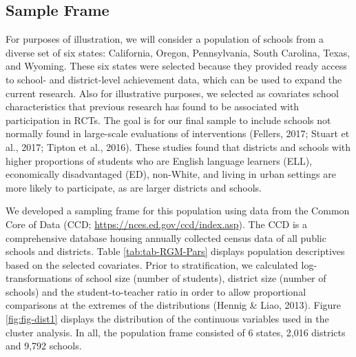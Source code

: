 \documentclass[english,man,floatsintext]{apa6}
\begin{document}
\hypertarget{sample-frame}{%
\subsection{Sample Frame}\label{sample-frame}}

For purposes of illustration, we will consider a population of schools from a diverse set of six states: California, Oregon, Pennsylvania, South Carolina, Texas, and Wyoming. These six states were selected because they provided ready access to school- and district-level achievement data, which can be used to expand the current research. Also for illustrative purposes, we selected as covariates school characteristics that previous research has found to be associated with participation in RCTs. The goal is for our final sample to include schools not normally found in large-scale evaluations of interventions (Fellers, 2017; Stuart et al., 2017; Tipton et al., 2016). These studies found that districts and schools with higher proportions of students who are English language learners (ELL), economically disadvantaged (ED), non-White, and living in urban settings are more likely to participate, as are larger districts and schools.

We developed a sampling frame for this population using data from the Common Core of Data (CCD; \url{https://nces.ed.gov/ccd/index.asp}). The CCD is a comprehensive database housing annually collected census data of all public schools and districts. Table \ref{tab:tab-RGM-Pars} displays population descriptives based on the selected covariates. Prior to stratification, we calculated log-transformations of school size (number of students), district size (number of schools) and the student-to-teacher ratio in order to allow proportional comparisons at the extremes of the distributions (Hennig \& Liao, 2013). Figure \ref{fig:fig-dist1} displays the distribution of the continuous variables used in the cluster analysis. In all, the population frame consisted of 6 states, 2,016 districts and 9,792 schools.
\end{document}
